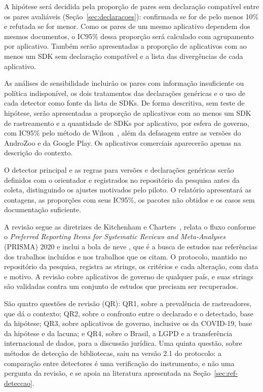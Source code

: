 \label{sec:analise}

A hipótese será decidida pela proporção de pares sem declaração compatível entre os pares avaliáveis (Seção~\ref{sec:declaracoes}): confirmada se for de pelo menos 10\% e refutada se for menor. Como os pares de um mesmo aplicativo dependem dos mesmos documentos, o IC95\% dessa proporção será calculado com agrupamento por aplicativo. Também serão apresentadas a proporção de aplicativos com ao menos um SDK sem declaração compatível e a lista das divergências de cada aplicativo.

As análises de sensibilidade incluirão os pares com informação insuficiente ou política indisponível, os dois tratamentos das declarações genéricas e o uso de cada detector como fonte da lista de SDKs. De forma descritiva, sem teste de hipótese, serão apresentadas a proporção de aplicativos com ao menos um SDK de rastreamento e a quantidade de SDKs por aplicativo, por esfera de governo, com IC95\% pelo método de Wilson~\cite{wilson1927}, além da defasagem entre as versões do AndroZoo e da Google Play. Os aplicativos comerciais aparecerão apenas na descrição do contexto.

O detector principal e as regras para versões e declarações genéricas serão definidos com o orientador e registrados no repositório da pesquisa antes da coleta, distinguindo os ajustes motivados pelo piloto. O relatório apresentará as contagens, as proporções com seus IC95\%, os pacotes não obtidos e os casos sem documentação suficiente.

\label{sec:revisao}

A revisão segue as diretrizes de Kitchenham e Charters~\cite{kitchenham2007}, relata o fluxo conforme o \emph{Preferred Reporting Items for Systematic Reviews and Meta-Analyses} (PRISMA) 2020 \cite{page2021} e inclui a bola de neve \cite{wohlin2014}, que é a busca de estudos nas referências dos trabalhos incluídos e nos trabalhos que os citam. O protocolo, mantido no repositório da pesquisa, registra as strings, os critérios e cada alteração, com data e motivo. A revisão cobre aplicativos de governo de qualquer país, e suas strings são validadas contra um conjunto de estudos que precisam ser recuperados.

São quatro questões de revisão (QR): QR1, sobre a prevalência de rastreadores, que dá o contexto; QR2, sobre o confronto entre o declarado e o detectado, base da hipótese; QR3, sobre aplicativos de governo, inclusive os da COVID-19, base da hipótese e da lacuna; e QR4, sobre o Brasil, a LGPD e a transferência internacional de dados, para a discussão jurídica. Uma quinta questão, sobre métodos de detecção de bibliotecas, saiu na versão 2.1 do protocolo: a comparação entre detectores é uma verificação do instrumento, e não uma pergunta da revisão, e se apoia na literatura apresentada na Seção~\ref{sec:ref-deteccao}.

